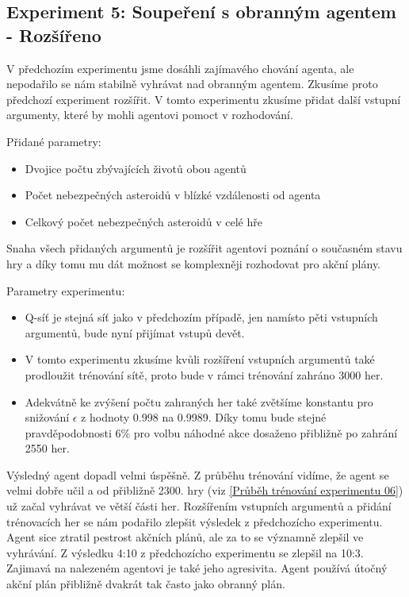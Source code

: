 \subsection{Experiment 5: Soupeření s obranným agentem - Rozšířeno}
V předchozím experimentu jsme dosáhli zajímavého chování agenta, ale nepodařilo se nám stabilně vyhrávat nad obranným agentem.
Zkusíme proto předchozí experiment rozšířit. 
V tomto experimentu zkusíme přidat další vstupní argumenty, které by mohli agentovi pomoct v rozhodování.

Přidané parametry:
\begin{itemize}
    \item Dvojice počtu zbývajících životů obou agentů            
    \item Počet nebezpečných asteroidů v blízké vzdálenosti od agenta
    \item Celkový počet nebezpečných asteroidů v celé hře
\end{itemize}
Snaha všech přidaných argumentů je rozšířit agentovi poznání o současném stavu hry a díky tomu mu dát možnost se komplexněji rozhodovat pro akční plány.

Parametry experimentu:
\begin{itemize}
    \item Q-síť je stejná síť jako v předchozím případě, jen namísto pěti vstupních argumentů, bude nyní přijímat vstupů devět.
    \item V tomto experimentu zkusíme kvůli rozšíření vstupních argumentů také prodloužit trénování sítě, proto bude v rámci trénování zahráno 3000 her.
    \item Adekvátně ke zvýšení počtu zahraných her také zvětšíme konstantu pro snižování $\epsilon$ z hodnoty 0.998 na 0.9989. Díky tomu bude stejné pravděpodobnosti 6\% pro volbu náhodné akce dosaženo přibližně po zahrání 2550 her.
\end{itemize}



Výsledný agent dopadl velmi úspěšně. Z průběhu trénování vidíme, že agent se velmi dobře učil a od přibližně 2300. hry (viz \ref{Průběh trénování experimentu 06}) už začal vyhrávat ve větší části her.
Rozšířením vstupních argumentů a přidání trénovacích her se nám podařilo zlepšit výsledek z předchozícho experimentu.
Agent sice ztratil pestrost akčních plánů, ale za to se významně zlepšil ve vyhrávání. Z výsledku 4:10 z předchozícho experimentu se zlepšil na 10:3.
Zajimavá na nalezeném agentovi je také jeho agresivita. Agent používá útočný akční plán přibližně dvakrát tak často jako obranný plán.


